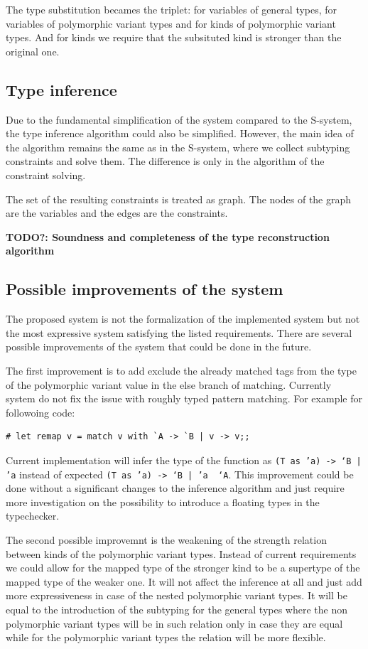 \documentclass[a4paper,11pt,oneside]{article}
\theoremstyle{definition}
\begin{document}
The type substitution becames the triplet: for variables of general types, for variables of polymorphic variant types and for kinds of polymorphic variant types. And for kinds we require that the subsituted kind is stronger than the original one.

\subsection{Type inference}

Due to the fundamental simplification of the system compared to the S-system, the type inference algorithm could also be simplified.
However, the main idea of the algorithm remains the same as in the S-system, where we collect subtyping constraints and solve them.
The difference is only in the algorithm of the constraint solving.

The set of the resulting constraints is treated as graph.
The nodes of the graph are the variables and the edges are the constraints.

\textbf{TODO?: Soundness and completeness of the type reconstruction algorithm}

\subsection{Possible improvements of the system}

The proposed system is not the formalization of the implemented system but not the most expressive system satisfying the listed requirements. There are several possible improvements of the system that could be done in the future.

The first improvement is to add exclude the already matched tags from the type of the polymorphic variant value in the else branch of matching. Currently system do not fix the issue with roughly typed pattern matching. For example for followoing code:

{\ttfamily\begin{verbatim}
# let remap v = match v with `A -> `B | v -> v;;
\end{verbatim}}

Current implementation will infer the type of the function as \texttt{(T as 'a) -> `B | 'a} instead of expected \texttt{(T as 'a) -> `B | 'a \ `A}.
This improvement could be done without a significant changes to the inference algorithm and just require more investigation on the possibility to introduce a floating types in the typechecker.

The second possible improvemnt is the weakening of the strength relation between kinds of the polymorphic variant types.
Instead of current requirements we could allow for the mapped type of the stronger kind to be a supertype of the mapped type of the weaker one.
It will not affect the inference at all and just add more expressiveness in case of the nested polymorphic variant types.
It will be equal to the introduction of the subtyping for the general types where the non polymorphic variant types will be in such relation only in case they are equal while for the polymorphic variant types the relation will be more flexible.
\end{document}

